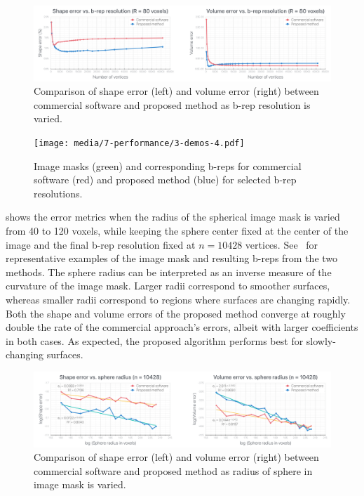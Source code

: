 \begin{figure}[ht!]
	\centering
	\includegraphics[scale=0.25]{media/7-performance/1-graph-1.pdf}
	\caption{Comparison of shape error (left) and volume error (right) between commercial software and proposed method as b-rep resolution is varied.}
	\label{fig:graph1}
\end{figure}
\begin{figure}[ht!]
	\centering
	\texttt{[image: media/7-performance/3-demos-4.pdf]}
	\caption{Image masks (green) and corresponding b-reps for commercial software (red) and proposed method (blue) for selected b-rep resolutions.}
	\label{fig:demos1}
\end{figure}
%
 shows the error metrics when the radius of the spherical image mask is varied from 40 to 120 voxels, while keeping the sphere center fixed at the center of the image and the final b-rep resolution fixed at $n = 10428$ vertices. See~ for representative examples of the image mask and resulting b-reps from the two methods. The sphere radius can be interpreted as an inverse measure of the curvature of the image mask. Larger radii correspond to smoother surfaces, whereas smaller radii correspond to regions where surfaces are changing rapidly. Both the shape and volume errors of the proposed method converge at roughly double the rate of the commercial approach's errors, albeit with larger coefficients in both cases. As expected, the proposed algorithm performs best for slowly-changing surfaces.
\begin{figure}[ht!]
	\centering
	\includegraphics[scale=0.25]{media/7-performance/1-graph-2.pdf}
	\caption{Comparison of shape error (left) and volume error (right) between commercial software and proposed method as radius of sphere in image mask is varied.}
	\label{fig:graph2}
\end{figure}
